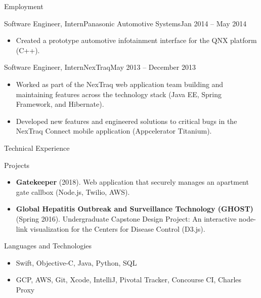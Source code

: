 \documentclass[]{mcdowellcv}
\begin{document}
\begin{cvsection}{Employment}
		\begin{cvsubsection}{Software Engineer, Intern}{Panasonic Automotive Systems}{Jan 2014 -- May 2014}
			\begin{itemize}
				\item Created a prototype automotive infotainment interface for the QNX platform (C++).
			\end{itemize}
		\end{cvsubsection}

		\begin{cvsubsection}{Software Engineer, Intern}{NexTraq}{May 2013 -- December 2013}
			\begin{itemize}
				\item Worked as part of the NexTraq web application team building and maintaining features across the technology stack (Java EE, Spring Framework, and Hibernate).
				\item Developed new features and engineered solutions to critical bugs in the NexTraq Connect mobile application (Appcelerator Titanium).
			\end{itemize}
		\end{cvsubsection}
	\end{cvsection}
	
	\begin{cvsection}{Technical Experience}
		\begin{cvsubsection}{Projects}{}{}
			\begin{itemize}
				\item \textbf{Gatekeeper} (2018). Web application that securely manages an apartment gate callbox (Node.js, Twilio, AWS).
				\item \textbf{Global Hepatitis Outbreak and Surveillance Technology (GHOST)} (Spring 2016). Undergraduate Capstone Design Project: An interactive node-link visualization for the Centers for Disease Control (D3.js).
			\end{itemize}
		\end{cvsubsection}
	\end{cvsection}
	
	\begin{cvsection}{Languages and Technologies}
		\begin{cvsubsection}{}{}{}	
			\begin{itemize}
				\item Swift, Objective-C, Java, Python, SQL
				\item GCP, AWS, Git, Xcode, IntelliJ, Pivotal Tracker, Concourse CI, Charles Proxy
			\end{itemize}
		\end{cvsubsection}
	\end{cvsection}
	
\end{document}
